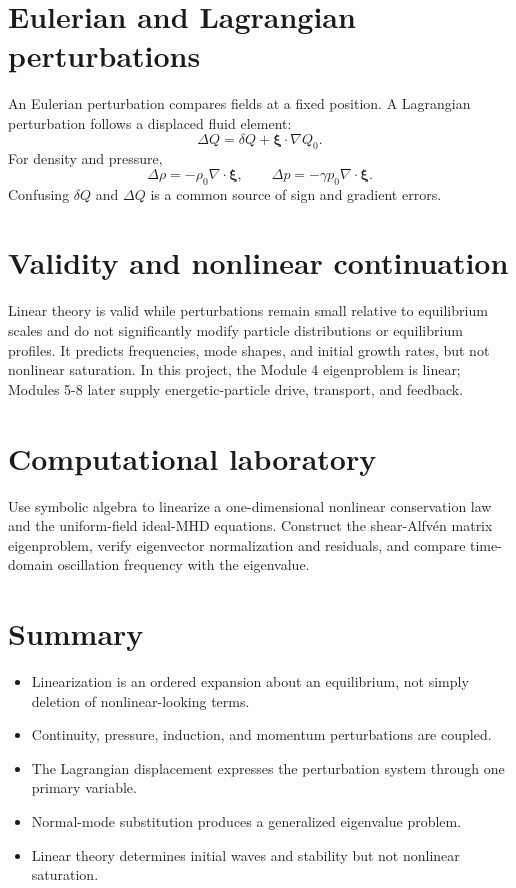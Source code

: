\documentclass[11pt]{article}
\begin{document}
\section{Eulerian and Lagrangian perturbations}

An Eulerian perturbation compares fields at a fixed position. A Lagrangian perturbation follows a displaced fluid element:
\begin{equation}
\Delta Q=\delta Q+\boldsymbol\xi\cdot\nabla Q_0.
\end{equation}
For density and pressure,
\begin{equation}
\Delta\rho=-\rho_0\nabla\cdot\boldsymbol\xi,\qquad
\Delta p=-\gamma p_0\nabla\cdot\boldsymbol\xi.
\end{equation}
Confusing $\delta Q$ and $\Delta Q$ is a common source of sign and gradient errors.


\section{Validity and nonlinear continuation}

Linear theory is valid while perturbations remain small relative to equilibrium scales and do not significantly modify particle distributions or equilibrium profiles. It predicts frequencies, mode shapes, and initial growth rates, but not nonlinear saturation. In this project, the Module 4 eigenproblem is linear; Modules 5-8 later supply energetic-particle drive, transport, and feedback.


\section{Computational laboratory}
Use symbolic algebra to linearize a one-dimensional nonlinear conservation law and the uniform-field ideal-MHD equations. Construct the shear-Alfvén matrix eigenproblem, verify eigenvector normalization and residuals, and compare time-domain oscillation frequency with the eigenvalue.

\section{Summary}
\begin{itemize}[leftmargin=1.6em]
\item Linearization is an ordered expansion about an equilibrium, not simply deletion of nonlinear-looking terms.
\item Continuity, pressure, induction, and momentum perturbations are coupled.
\item The Lagrangian displacement expresses the perturbation system through one primary variable.
\item Normal-mode substitution produces a generalized eigenvalue problem.
\item Linear theory determines initial waves and stability but not nonlinear saturation.
\end{itemize}
\end{document}
